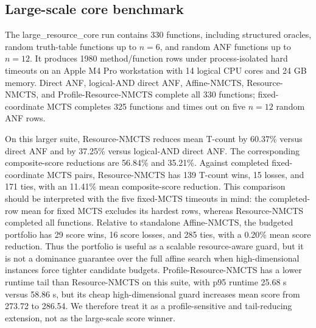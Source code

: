 \documentclass[11pt]{article}
\newcommand{\method}{Resource-NMCTS}
\newcommand{\affinemethod}{Affine-NMCTS}
\newcommand{\profilemethod}{Profile-Resource-NMCTS}
\newcommand{\largedataset}{large\_resource\_core}
\begin{document}
\subsection{Large-scale core benchmark}

The \largedataset{} run contains 330 functions, including structured oracles,
random truth-table functions up to $n=6$, and random ANF functions up to
$n=12$.  It produces 1980 method/function rows under process-isolated hard
timeouts on an Apple M4 Pro workstation with 14 logical CPU cores and 24 GB
memory.  Direct ANF, logical-AND direct ANF, \affinemethod{}, \method{}, and
\profilemethod{} complete all 330 functions; fixed-coordinate MCTS completes
325 functions and times out on five $n=12$ random ANF rows.

\begin{table}[t]
\centering
\small
\caption{Mean logical resources on completed rows in the \largedataset{}
benchmark.  The fixed-MCTS mean excludes five timeout rows, so its completed-row
average is censored toward easier instances.}
\label{tab:large-resources}

\end{table}

\begin{table}[t]
\centering
\small
\caption{Runtime distribution on the \largedataset{} benchmark.}
\label{tab:large-runtime}

\end{table}

On this larger suite, \method{} reduces mean T-count by 60.37\% versus direct
ANF and by 37.25\% versus logical-AND direct ANF.  The corresponding
composite-score reductions are 56.84\% and 35.21\%.  Against completed
fixed-coordinate MCTS pairs, \method{} has 139 T-count wins, 15 losses, and 171
ties, with an 11.41\% mean composite-score reduction.  This comparison should
be interpreted with the five fixed-MCTS timeouts in mind: the completed-row
mean for fixed MCTS excludes its hardest rows, whereas \method{} completed all
functions.  Relative to standalone \affinemethod{}, the budgeted portfolio has
29 score wins, 16 score losses, and 285 ties, with a 0.20\% mean score
reduction.  Thus the portfolio is useful as a scalable resource-aware guard,
but it is not a dominance guarantee over the full affine search when
high-dimensional instances force tighter candidate budgets.  \profilemethod{}
has a lower runtime tail than \method{} on this suite, with p95 runtime 25.68 s
versus 58.86 s, but its cheap high-dimensional guard increases mean score from
273.72 to 286.54.  We therefore treat it as a profile-sensitive and
tail-reducing extension, not as the large-scale score winner.
\end{document}

